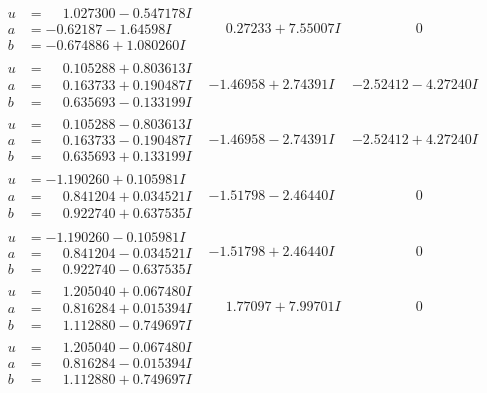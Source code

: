 \documentclass[1p]{elsarticle_modified}
\theoremstyle{definition}
\begin{document}
$$\begin{array}{c|c|c}
\begin{aligned}
u &= \phantom{-}1.027300 - 0.547178 I \\
a &= -0.62187 - 1.64598 I \\
b &= -0.674886 + 1.080260 I\end{aligned}
 & \phantom{-}0.27233 + 7.55007 I & \phantom{-0.000000 } 0 \\ \hline\begin{aligned}
u &= \phantom{-}0.105288 + 0.803613 I \\
a &= \phantom{-}0.163733 + 0.190487 I \\
b &= \phantom{-}0.635693 - 0.133199 I\end{aligned}
 & -1.46958 + 2.74391 I & -2.52412 - 4.27240 I \\ \hline\begin{aligned}
u &= \phantom{-}0.105288 - 0.803613 I \\
a &= \phantom{-}0.163733 - 0.190487 I \\
b &= \phantom{-}0.635693 + 0.133199 I\end{aligned}
 & -1.46958 - 2.74391 I & -2.52412 + 4.27240 I \\ \hline\begin{aligned}
u &= -1.190260 + 0.105981 I \\
a &= \phantom{-}0.841204 + 0.034521 I \\
b &= \phantom{-}0.922740 + 0.637535 I\end{aligned}
 & -1.51798 - 2.46440 I & \phantom{-0.000000 } 0 \\ \hline\begin{aligned}
u &= -1.190260 - 0.105981 I \\
a &= \phantom{-}0.841204 - 0.034521 I \\
b &= \phantom{-}0.922740 - 0.637535 I\end{aligned}
 & -1.51798 + 2.46440 I & \phantom{-0.000000 } 0 \\ \hline\begin{aligned}
u &= \phantom{-}1.205040 + 0.067480 I \\
a &= \phantom{-}0.816284 + 0.015394 I \\
b &= \phantom{-}1.112880 - 0.749697 I\end{aligned}
 & \phantom{-}1.77097 + 7.99701 I & \phantom{-0.000000 } 0 \\ \hline\begin{aligned}
u &= \phantom{-}1.205040 - 0.067480 I \\
a &= \phantom{-}0.816284 - 0.015394 I \\
b &= \phantom{-}1.112880 + 0.749697 I\end{aligned}

\end{array}$$
\end{document}
